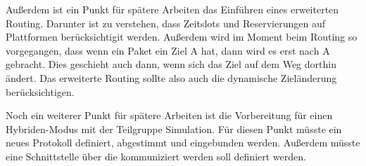 Außerdem ist ein Punkt für spätere Arbeiten das Einführen eines erweiterten Routing. Darunter ist zu verstehen, dass Zeitslots und Reservierungen auf Plattformen berücksichtigit werden. Außerdem wird im Moment beim Routing so vorgegangen, dass wenn ein Paket ein Ziel A hat, dann wird es erst nach A gebracht. Dies geschieht auch dann, wenn sich das Ziel auf dem Weg dorthin ändert. Das erweiterte Routing sollte also auch die dynamische Zieländerung berücksichtigen.

Noch ein weiterer Punkt für spätere Arbeiten ist die Vorbereitung für einen Hybriden-Modus mit der Teilgruppe Simulation. Für diesen Punkt müsste ein neues Protokoll definiert, abgestimmt und eingebunden werden. Außerdem müsste eine Schnittstelle über die kommuniziert werden soll definiert werden.

